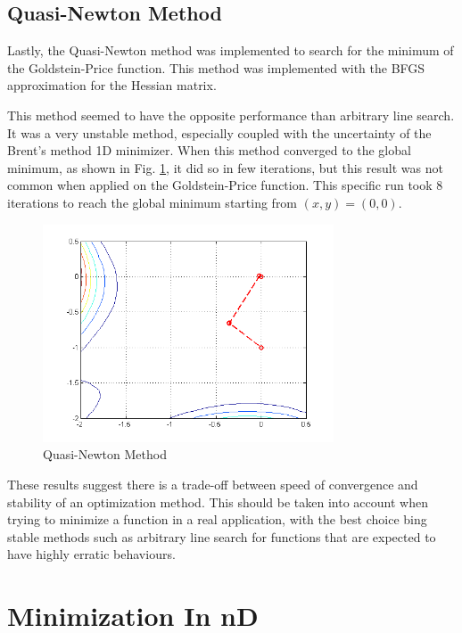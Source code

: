 \documentclass[journal]{IEEEtran}
\begin{document}
\subsection{Quasi-Newton Method}

Lastly, the Quasi-Newton method was implemented to search for the minimum of the Goldstein-Price function. This method was implemented with the BFGS approximation for the Hessian matrix.

This method seemed to have the opposite performance than arbitrary line search. It was a very unstable method, especially coupled with the uncertainty of the Brent's method 1D minimizer. When this method converged to the global minimum, as shown in Fig. \ref{figQN}, it did so in few iterations, but this result was not common when applied on the Goldstein-Price function. This specific run took 8 iterations to reach the global minimum starting from $(x,y) = (0,0)$.

\begin{figure}[H]
\centering
\includegraphics[width=3.4in]{figures/2d2-quasiNewton.png}
\caption{Quasi-Newton Method}
\label{figQN}
\end{figure}

These results suggest there is a trade-off between speed of convergence and stability of an optimization method. This should be taken into account when trying to minimize a function in a real application, with the best choice bing stable methods such as arbitrary line search for functions that are expected to have highly erratic behaviours.


\section{Minimization In nD}
\end{document}

